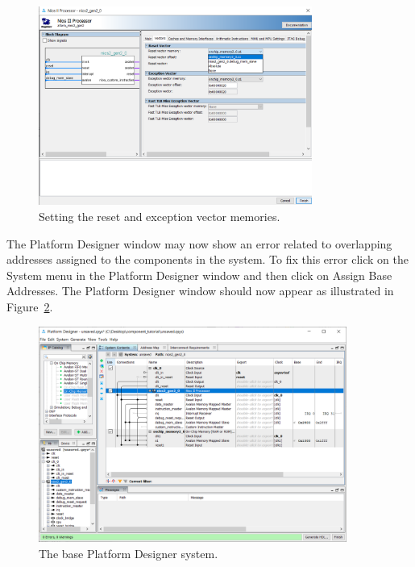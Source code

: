 \documentclass[11pt, twoside, pdftex]{article}
\begin{document}
\begin{figure}[H]
   \begin{center}
        \includegraphics[width=0.8\textwidth]{figures/figure11.png}
   \end{center}
   \caption{Setting the reset and exception vector memories.}
	\label{fig:11}
\end{figure}

\newpage
The Platform Designer window may now show an error related to overlapping addresses assigned to the 
components in the system. To fix this error click on the {\sf System} menu in the Platform Designer window and 
then click on {\sf Assign Base Addresses}. The Platform Designer window should now appear as illustrated in
Figure~\ref{fig:12}. 

\begin{figure}[H]
   \begin{center}
        \includegraphics[width=0.9\textwidth]{figures/figure12.png}
   \end{center}
   \caption{The base Platform Designer system.}
	\label{fig:12}
	\end{figure}
\end{document}
